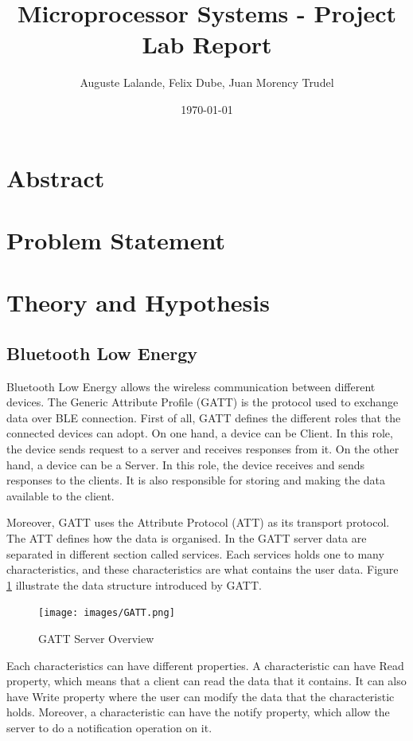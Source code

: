 \documentclass[12pt]{article}
\title{Microprocessor Systems - Project Lab Report}
\author{Auguste Lalande, Felix Dube, Juan Morency Trudel}
\date{\today}
\begin{document}
\maketitle
\clearpage

\tableofcontents
\clearpage

\section{Abstract}

\section{Problem Statement}

\section{Theory and Hypothesis}
\subsection{Bluetooth Low Energy}
Bluetooth Low Energy allows the wireless communication between different devices. The Generic Attribute Profile (GATT) is the protocol used to exchange data over BLE connection. First of all, GATT defines the different roles that the connected devices can adopt. On one hand, a device can be Client. In this role, the device sends request to a server and receives responses from it. On the other hand, a device can be a Server. In this role, the device receives and sends responses to the clients. It is also responsible for storing and making the data available to the client.

Moreover, GATT uses the Attribute Protocol (ATT) as its transport protocol. The ATT defines how the data is organised. In the GATT server data are separated in different section called services. Each services holds one to many characteristics, and these characteristics are what contains the user data. Figure \ref{fig:gatt} illustrate the data structure introduced by GATT.

\begin{figure}[!htb]
 \centering
 \texttt{[image: images/GATT.png]}
 \caption{GATT Server Overview}
 \label{fig:gatt}
\end{figure}

Each characteristics can have different properties. A characteristic can have Read property, which means that a client can read the data that it contains. It can also have Write property where the user can modify the data that the characteristic holds. Moreover, a characteristic can have the notify property, which allow the server to do a notification operation on it.
\end{document}
